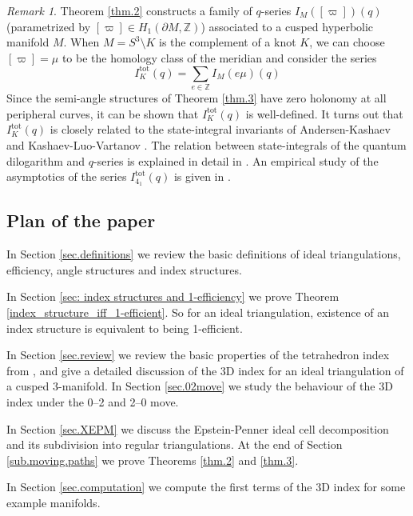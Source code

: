 \documentclass[12pt]{amsart}
\theoremstyle{definition}
\theoremstyle{remark}
\newtheorem{rmk}[thm]{Remark}
\def\BZ{\mathbb Z}
\def\pt{\partial}
\def\lbl{\label}
\begin{document}
\begin{rmk}
Theorem \ref{thm.2} constructs a family of $q$-series $I_M([\varpi])(q)$
(parametrized by $[\varpi] \in H_1(\pt M,\BZ)$) associated to a 
cusped hyperbolic manifold $M$. When $M = S^3 \setminus K$ is the complement of a knot $K$,
we can choose $[\varpi]=\mu$ to be the homology class of the meridian 
and consider the series
\begin{equation}
\lbl{eq.indtotal}
I^{\mathrm{tot}}_K(q)=\sum_{e \in \BZ} I_M(e \mu)(q)
\end{equation}
Since the semi-angle structures of Theorem \ref{thm.3} have zero holonomy
at all peripheral curves, it can be shown that $I^{\mathrm{tot}}_K(q)$ is 
well-defined. It turns out that $I^{\mathrm{tot}}_K(q)$ is closely related to
the state-integral invariants of Andersen-Kashaev and Kashaev-Luo-Vartanov
\cite{AK,KLV}. The relation between state-integrals of the quantum dilogarithm
and $q$-series is explained in detail in \cite{GK}. An empirical study
of the asymptotics of the series $I^{\mathrm{tot}}_{4_1}(q)$ is given in
\cite{GZ}.
\end{rmk}

\subsection{Plan of the paper}
\label{sub.plan}

In Section \ref{sec.definitions} we review the basic definitions of ideal
triangulations, efficiency, angle structures and index 
structures.

In Section \ref{sec: index structures and 1-efficiency} we prove Theorem 
\ref{index_structure_iff_1-efficient}. So for an ideal triangulation, existence of an index structure is equivalent to being
1-efficient. 

In Section \ref{sec.review} we review the basic properties of the tetrahedron
index from \cite{Ga:index}, and give a detailed discussion of the 3D index for an 
ideal triangulation of a cusped 3-manifold. In Section \ref{sec.02move} we study the
behaviour of the 3D index under the 0--2 and 2--0 move.

In Section \ref{sec.XEPM} we discuss the Epstein-Penner ideal cell 
decomposition and its subdivision into regular triangulations. At the end
of Section \ref{sub.moving.paths} we prove Theorems \ref{thm.2} and 
\ref{thm.3}.

In Section \ref{sec.computation} we compute the first terms of the 3D index for some example manifolds.
\end{document}
